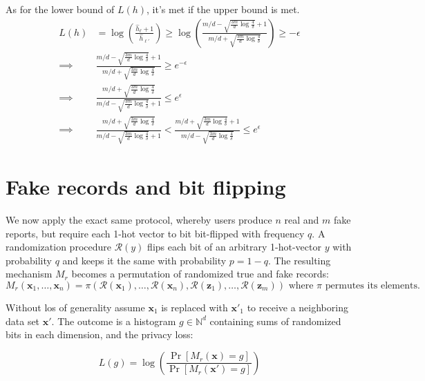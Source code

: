 \documentclass[11pt]{article}
\newcommand{\bbx}{\pmb{x}}
\newcommand{\bbz}{\pmb{z}}
\newcommand{\cR}{\mathcal{R}}
\newcommand{\N}{\mathbb{N}}
\begin{document}
As for the lower bound of $L(h)$, it's met if the upper bound is met.
 \begin{align*}
 L(h) & =  \log  \left ( \frac{\hat{h}_\ell + 1}{\hat{h}_{\ell'}} \right ) \ge \log  \left ( \frac{ m/d - \sqrt{  \frac{3m}{d} \log{\frac{4}{\delta}}} + 1}{  m/d + \sqrt{  \frac{3m}{d} \log{\frac{4}{\delta}}} } \right ) \ge - \epsilon  \\
\implies &  \frac{ m/d - \sqrt{  \frac{3m}{d} \log{\frac{4}{\delta}}} + 1}{  m/d + \sqrt{  \frac{3m}{d} \log{\frac{4}{\delta}}}} \ge e^{-\epsilon} \\
 \implies &  \frac{  m/d + \sqrt{  \frac{3m}{d} \log{\frac{4}{\delta}}}}  { m/d - \sqrt{  \frac{3m}{d} \log{\frac{4}{\delta}}} + 1} \le e^{\epsilon}  \\
\implies &   \frac{  m/d + \sqrt{  \frac{3m}{d} \log{\frac{4}{\delta}}}}  { m/d - \sqrt{  \frac{3m}{d} \log{\frac{4}{\delta}}} + 1} < \frac{ m/d + \sqrt{  \frac{3m}{d} \log{\frac{4}{\delta}}} + 1}{  m/d - \sqrt{  \frac{3m}{d} \log{\frac{4}{\delta}}}} \le e^{\epsilon} 
\end{align*}



\section{Fake records and bit flipping}

We now apply the exact same protocol, whereby users produce $n$ real and $m$ fake reports, but require each 1-hot vector to bit bit-flipped with frequency $q$.  A randomization procedure $\cR(y)$ flips each bit of an arbitrary 1-hot-vector $y$ with probability $q$ and keeps it the same with probability $p=1-q$.  The resulting mechanism $M_r$ becomes a permutation of randomized true and fake records:
\[
M_r(\bbx_1,  \dots , \bbx_n) = \pi (\cR(\bbx_1), \dots , \cR(\bbx_n), \cR(\bbz_1), \dots , \cR(\bbz_m)) \text{ where } \pi \text{ permutes its elements}. 
\]

Without los of generality assume $\bbx_1$ is replaced with $\bbx'_1$ to receive a neighboring data set $\bbx'$.  The outcome is a histogram $g \in \N^d$ containing sums of randomized bits in each dimension, and the privacy loss:

\begin{equation} \label{eq:lgbound}
L(g) = \log \left ( \frac{\Pr[M_r(\bbx) = g]}{\Pr[M_r(\bbx') = g]} \right )
\end{equation}
\end{document}
